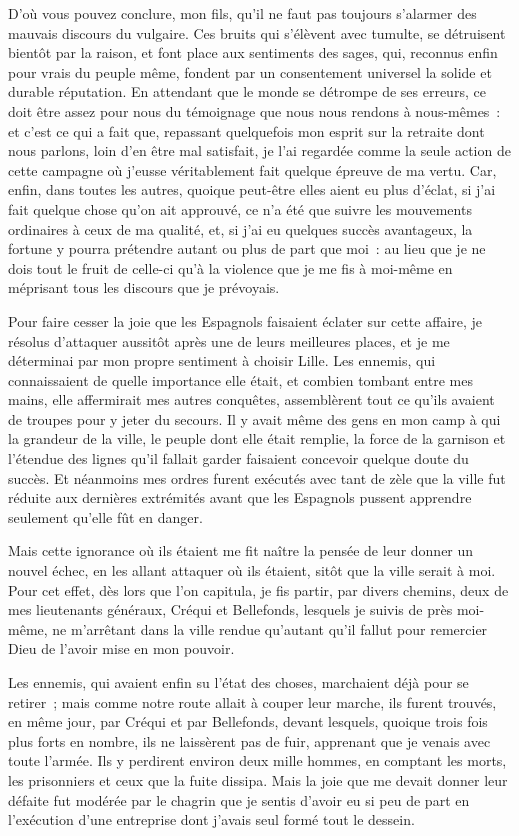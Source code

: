 \documentclass[french,twoside]{book} %
\begin{document}
D’où vous pouvez conclure, mon fils, qu’il ne faut pas toujours s’alarmer des mauvais discours du vulgaire. Ces bruits qui s’élèvent avec tumulte, se détruisent bientôt par la raison, et font place aux sentiments des sages, qui, reconnus enfin pour vrais du peuple même, fondent par un consentement universel la solide et durable réputation. En attendant que le monde se détrompe de ses erreurs, ce doit être assez pour nous du témoignage que nous nous rendons à nous-mêmes : et c’est ce qui a fait que, repassant quelquefois mon esprit sur la retraite dont nous parlons, loin d’en être mal satisfait, je l’ai regardée comme la seule action de cette campagne où j’eusse véritablement fait quelque épreuve de ma vertu. Car, enfin, dans toutes les autres, quoique peut-être elles aient eu plus d’éclat, si j’ai fait quelque chose qu’on ait approuvé, ce n’a été que suivre les mouvements ordinaires à ceux de ma qualité, et, si j’ai eu quelques succès avantageux, la fortune y pourra prétendre autant ou plus de part que moi : au lieu que je ne dois tout le fruit de celle-ci qu’à la violence que je me fis à moi-même en méprisant tous les discours que je prévoyais.\par
Pour faire cesser la joie que les Espagnols faisaient éclater sur cette affaire, je résolus d’attaquer aussitôt après une de leurs meilleures places, et je me déterminai par mon propre sentiment à choisir Lille. Les ennemis, qui connaissaient de quelle importance elle était, et combien tombant entre mes mains, elle affermirait mes autres conquêtes, assemblèrent tout ce qu’ils avaient de troupes pour y jeter du secours. Il y avait même des gens en mon camp à qui la grandeur de la ville, le peuple dont elle était remplie, la force de la garnison et l’étendue des lignes qu’il fallait garder faisaient concevoir quelque doute du succès. Et néanmoins mes ordres furent exécutés avec tant de zèle que la ville fut réduite aux dernières extrémités avant que les Espagnols pussent apprendre seulement qu’elle fût en danger.\par
Mais cette ignorance où ils étaient me fit naître la pensée de leur donner un nouvel échec, en les allant attaquer où ils étaient, sitôt que la ville serait à moi. Pour cet effet, dès lors que l’on capitula, je fis partir, par divers chemins, deux de mes lieutenants généraux, Créqui et Bellefonds, lesquels je suivis de près moi-même, ne m’arrêtant dans la ville rendue qu’autant qu’il fallut pour remercier Dieu de l’avoir mise en mon pouvoir.\par
Les ennemis, qui avaient enfin su l’état des choses, marchaient déjà pour se retirer ; mais comme notre route allait à couper leur marche, ils furent trouvés, en même jour, par Créqui et par Bellefonds, devant lesquels, quoique trois fois plus forts en nombre, ils ne laissèrent pas de fuir, apprenant que je venais avec toute l’armée. Ils y perdirent environ deux mille hommes, en comptant les morts, les prisonniers et ceux que la fuite dissipa. Mais la joie que me devait donner leur défaite fut modérée par le chagrin que je sentis d’avoir eu si peu de part en l’exécution d’une entreprise dont j’avais seul formé tout le dessein.\par
\end{document}
